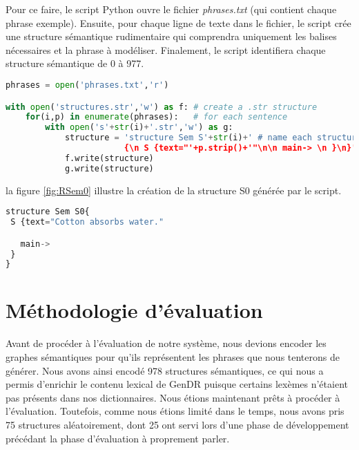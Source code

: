 Pour ce faire, le script Python ouvre le fichier \emph{phrases.txt} (qui contient chaque phrase exemple). Ensuite, pour chaque ligne de texte dans le fichier, le script crée une structure sémantique rudimentaire qui comprendra uniquement les balises nécessaires et la phrase à modéliser. Finalement, le script identifiera chaque structure sémantique de 0 à 977.

\begin{lstlisting}[language=Python, caption = Création des structures sémantiques vides, label=structurepython]
phrases = open('phrases.txt','r')

with open('structures.str','w') as f: # create a .str structure
    for(i,p) in enumerate(phrases):   # for each sentence
        with open('s'+str(i)+'.str','w') as g:
            structure = 'structure Sem S'+str(i)+' # name each structure by enumeration
						{\n S {text="'+p.strip()+'"\n\n main-> \n }\n}' # insert as texte the sentence
            f.write(structure)
            g.write(structure)
\end{lstlisting}

la figure \ref{fig:RSem0} illustre la création de la structure S0 générée par le script.

\begin{lstlisting}[language=Python, caption = Graphe sémantique de base généré par le script, label=fig:RSem0]
structure Sem S0{
 S {text="Cotton absorbs water."

   main-> 
 }
}
\end{lstlisting}

\section{Méthodologie d'évaluation}

Avant de procéder à l'évaluation de notre système, nous devions encoder les graphes sémantiques pour qu'ils représentent les phrases que nous tenterons de générer. Nous avons ainsi encodé 978 structures sémantiques, ce qui nous a permis d'enrichir le contenu lexical de GenDR puisque certains lexèmes n'étaient pas présents dans nos dictionnaires. Nous étions maintenant prêts à procéder à l'évaluation. Toutefois, comme nous étions limité dans le temps, nous avons pris 75 structures aléatoirement, dont 25 ont servi lors d'une phase de développement précédant la phase d'évaluation à proprement parler. 

